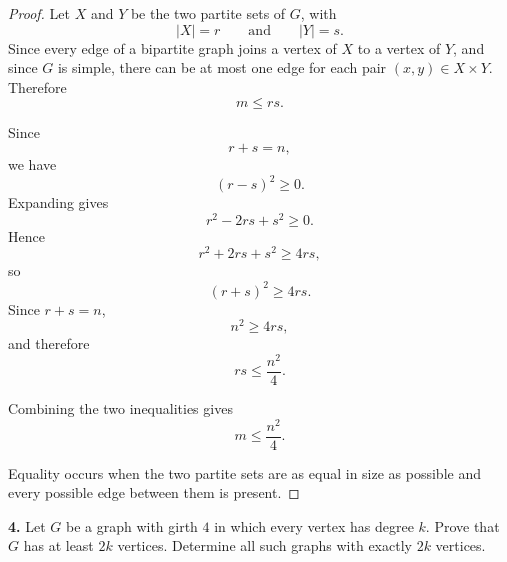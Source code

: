 \documentclass[12pt]{amsart}
\theoremstyle{conjecture}
\theoremstyle{definition}
\theoremstyle{question}
\theoremstyle{theorem}
\begin{document}
    \begin{proof}
        Let $X$ and $Y$ be the two partite sets of $G$, with
        \[
            |X|=r
            \qquad\text{and}\qquad
            |Y|=s.
        \]
        Since every edge of a bipartite graph joins a vertex of $X$ to a
        vertex of $Y$, and since $G$ is simple, there can be at most one
        edge for each pair $(x,y)\in X\times Y$. Therefore
        \[
            m\leq rs.
        \]

        Since
        \[
            r+s=n,
        \]
        we have
        \[
            (r-s)^2\geq 0.
        \]
        Expanding gives
        \[
            r^2-2rs+s^2\geq 0.
        \]
        Hence
        \[
            r^2+2rs+s^2\geq 4rs,
        \]
        so
        \[
            (r+s)^2\geq 4rs.
        \]
        Since $r+s=n$,
        \[
            n^2\geq 4rs,
        \]
        and therefore
        \[
            rs\leq \frac{n^2}{4}.
        \]

        Combining the two inequalities gives
        \[
            \boxed{m\leq \frac{n^2}{4}}.
        \]

        Equality occurs when the two partite sets are as equal in size as
        possible and every possible edge between them is present.
    \end{proof}

    \textbf{4.} Let $G$ be a graph with girth $4$ in which every vertex has
    degree $k$. Prove that $G$ has at least $2k$ vertices. Determine all
    such graphs with exactly $2k$ vertices.
\end{document}
